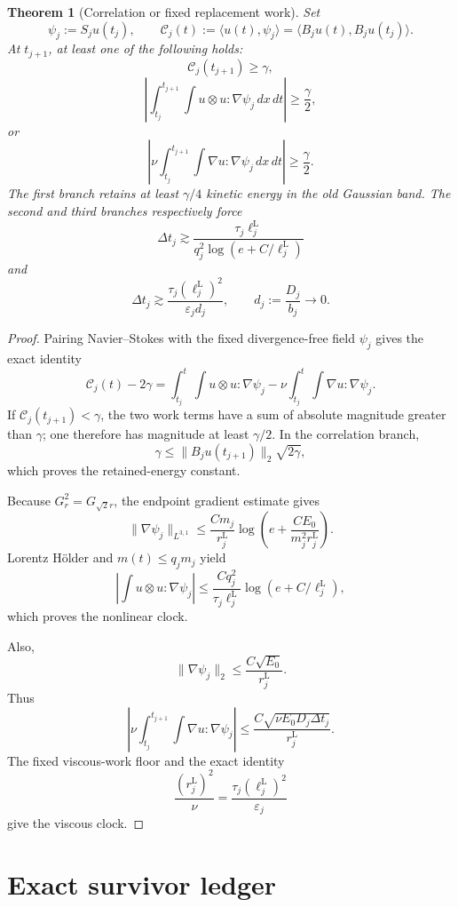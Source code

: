 \documentclass[11pt]{article}
\newtheorem{theorem}{Theorem}
\theoremstyle{definition}
\theoremstyle{remark}
\newcommand{\eps}{\varepsilon}
\begin{document}
\begin{theorem}[Correlation or fixed replacement work]
Set
\[
 \psi_j:=S_ju(t_j),
 \qquad
 \mathcal C_j(t):=
 \langle u(t),\psi_j\rangle
 =\langle B_ju(t),B_ju(t_j)\rangle.
\]
At \(t_{j+1}\), at least one of the following holds:
\[
 \mathcal C_j(t_{j+1})\ge\gamma,
\]
\[
 \left|
 \int_{t_j}^{t_{j+1}}\!\!\int
 u\otimes u:\nabla\psi_j\,dx\,dt
 \right|\ge\frac{\gamma}{2},
\]
or
\[
 \left|
 \nu\int_{t_j}^{t_{j+1}}\!\!\int
 \nabla u:\nabla\psi_j\,dx\,dt
 \right|\ge\frac{\gamma}{2}.
\]
The first branch retains at least \(\gamma/4\) kinetic energy in the old
Gaussian band.  The second and third branches respectively force
\[
 \Delta t_j
 \gtrsim
 \frac{\tau_j\ell_j^{\mathrm L}}
 {q_j^2\log(e+C/\ell_j^{\mathrm L})}
\]
and
\[
 \Delta t_j
 \gtrsim
 \frac{\tau_j(\ell_j^{\mathrm L})^2}
 {\eps_jd_j},
 \qquad
 d_j:=\frac{D_j}{b_j}\to0.
\]
\end{theorem}

\begin{proof}
Pairing Navier--Stokes with the fixed divergence-free field \(\psi_j\)
gives the exact identity
\[
 \mathcal C_j(t)-2\gamma
 =
 \int_{t_j}^{t}\!\!\int u\otimes u:\nabla\psi_j
 -
 \nu\int_{t_j}^{t}\!\!\int\nabla u:\nabla\psi_j.
\]
If \(\mathcal C_j(t_{j+1})<\gamma\), the two work terms have a sum of
absolute magnitude greater than \(\gamma\); one therefore has magnitude at
least \(\gamma/2\).  In the correlation branch,
\[
 \gamma
 \le\|B_ju(t_{j+1})\|_2\sqrt{2\gamma},
\]
which proves the retained-energy constant.

Because \(G_r^2=G_{\sqrt2r}\), the endpoint gradient estimate gives
\[
 \|\nabla\psi_j\|_{L^{3,1}}
 \le
 \frac{Cm_j}{r_j^{\mathrm L}}
 \log\!\left(e+\frac{CE_0}{m_j^2r_j^{\mathrm L}}\right).
\]
Lorentz H\"older and \(m(t)\le q_jm_j\) yield
\[
 \left|\int u\otimes u:\nabla\psi_j\right|
 \le
 \frac{Cq_j^2}{\tau_j\ell_j^{\mathrm L}}
 \log(e+C/\ell_j^{\mathrm L}),
\]
which proves the nonlinear clock.

Also,
\[
 \|\nabla\psi_j\|_2\le\frac{C\sqrt{E_0}}{r_j^{\mathrm L}}.
\]
Thus
\[
 \left|
 \nu\int_{t_j}^{t_{j+1}}\!\!\int\nabla u:\nabla\psi_j
 \right|
 \le
 \frac{C\sqrt{\nu E_0D_j\Delta t_j}}{r_j^{\mathrm L}}.
\]
The fixed viscous-work floor and the exact identity
\[
 \frac{(r_j^{\mathrm L})^2}{\nu}
 =
 \frac{\tau_j(\ell_j^{\mathrm L})^2}{\eps_j}
\]
give the viscous clock.
\end{proof}

\section{Exact survivor ledger}
\end{document}
